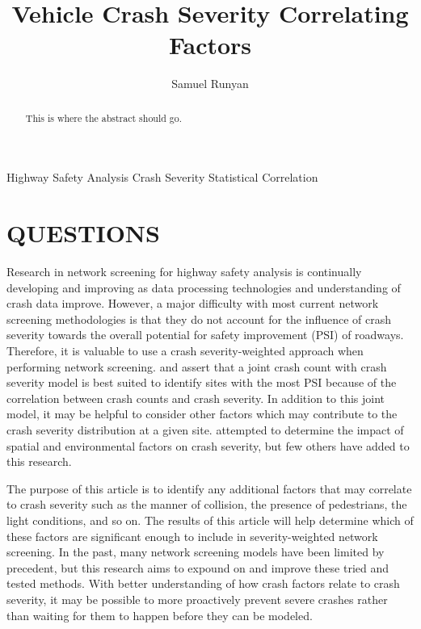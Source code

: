 \documentclass[3p, authoryear]{elsarticle} %
\begin{document}
\begin{frontmatter}

  \title{Vehicle Crash Severity Correlating Factors}
    \author[Brigham Young University]{Samuel Runyan}
      \address[Brigham Young University]{Civil and Environmental Engineering Department, 430 Engineering Building, Provo, Utah 84602}
    
  \begin{abstract}
  This is where the abstract should go.
  \end{abstract}
   \begin{keyword} Highway Safety Analysis Crash Severity Statistical Correlation\end{keyword}
 \end{frontmatter}

\hypertarget{intro}{%
\section{QUESTIONS}\label{intro}}

Research in network screening for highway safety analysis is continually developing and improving as data processing technologies and understanding of crash data improve. However, a major difficulty with most current network screening methodologies is that they do not account for the influence of crash severity towards the overall potential for safety improvement (PSI) of roadways. Therefore, it is valuable to use a crash severity-weighted approach when performing network screening. \citet{yasmin2018} and \citet{afghari2020} assert that a joint crash count with crash severity model is best suited to identify sites with the most PSI because of the correlation between crash counts and crash severity. In addition to this joint model, it may be helpful to consider other factors which may contribute to the crash severity distribution at a given site. \citet{ghadi2020} attempted to determine the impact of spatial and environmental factors on crash severity, but few others have added to this research.

The purpose of this article is to identify any additional factors that may correlate to crash severity such as the manner of collision, the presence of pedestrians, the light conditions, and so on. The results of this article will help determine which of these factors are significant enough to include in severity-weighted network screening. In the past, many network screening models have been limited by precedent, but this research aims to expound on and improve these tried and tested methods. With better understanding of how crash factors relate to crash severity, it may be possible to more proactively prevent severe crashes rather than waiting for them to happen before they can be modeled.
\end{document}
